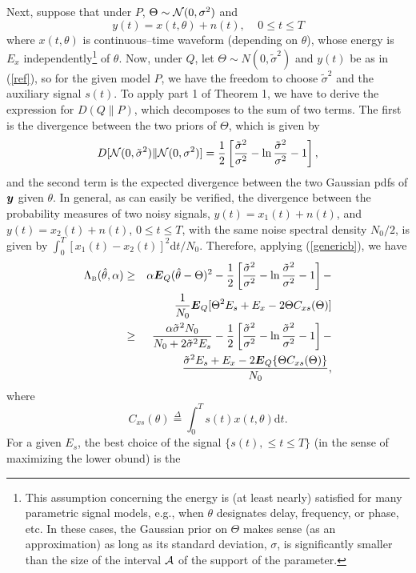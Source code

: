 \documentclass[11pt,epsf]{article}
\newcommand {\dfn} {\stackrel{\Delta} {=}}
\newcommand{\tsig}{\tilde{\sigma}}
\newcommand{\ct}{\hat{\theta}}
\newcommand {\by} {\mbox{\boldmath $y$}}
\newcommand {\bE} {\mbox{\boldmath $E$}}
\newcommand{\calA}{{\cal A}}
\newcommand{\calN}{{\cal N}}
\begin{document}
Next, suppose that under $P$, $\Theta\sim \calN(0,\sigma^2)$ and
\begin{equation}
y(t)=x(t,\theta)+n(t),~~~~~0\le t\le T
\end{equation}
where $x(t,\theta)$ is continuous--time waveform (depending on $\theta$),
whose energy is $E_x$ independently\footnote{This assumption concerning the
energy is (at least
nearly) satisfied for many parametric signal models, e.g., when $\theta$ designates
delay, frequency, or phase, etc. In these cases, the Gaussian prior on
$\Theta$ makes sense (as an approximation) as long as its standard deviation,
$\sigma$, is significantly smaller than the size of the interval $\calA$
of the support of the parameter.}
of $\theta$.
Now, under $Q$, let $\Theta\sim N(0,\tsig^2)$ and $y(t)$ be as in (\ref{ref}),
so for the given model $P$, 
we have the freedom to choose $\tsig^2$ and the auxiliary signal $s(t)$.
To apply part 1 of Theorem 1, we have
to derive the expression for $D(Q\|P)$, which decomposes to the sum of two
terms. The first is the divergence between the two priors of $\Theta$, which
is given by
\begin{equation}
D[\calN(0,\tsig^2)\|\calN(0,\sigma^2)]=\frac{1}{2}\left[
\frac{\tsig^2}{\sigma^2}-
\ln\frac{\tsig^2}{\sigma^2}-1\right],
\end{equation}
and the second term is the expected 
divergence between the two Gaussian pdfs of $\by$ given $\theta$.
In general, as can easily be verified, 
the divergence between the probability measures of two noisy signals,
$y(t)=x_1(t)+n(t)$, and
$y(t)=x_2(t)+n(t)$, $0\le t\le T$, with the same noise spectral density
$N_0/2$, is given by $\int_0^T[x_1(t)-x_2(t)]^2\mbox{d}t/N_0$.
Therefore, applying (\ref{genericb}), we have
\begin{eqnarray}
\label{1stbound}
\Lambda_{\mbox{\tiny B}}(\ct,\alpha)&\ge&\alpha
\bE_Q(\ct-\Theta)^2-\frac{1}{2}\left[\frac{\tsig^2}{\sigma^2}-
\ln\frac{\tsig^2}{\sigma^2}-1\right]-\nonumber\\
& &\frac{1}{N_0}\bE_Q[\Theta^2E_s+E_x-2\Theta C_{xs}(\Theta)]\\
&\ge&\frac{\alpha\tsig^2N_0}{N_0+2\tsig^2E_s}-\frac{1}{2}\left[\frac{\tsig^2}{\sigma^2}-
\ln\frac{\tsig^2}{\sigma^2}-1\right]-\nonumber\\
& &\frac{\tsig^2E_s+E_x-2\bE_Q\{\Theta
C_{xs}(\Theta)\}}{N_0},
\end{eqnarray}
where
$$C_{xs}(\theta)\dfn\int_0^Ts(t)x(t,\theta)\mbox{d}t.$$
For a given $E_s$, the best choice of the signal $\{s(t),\le t\le T\}$ 
(in the sense of maximizing the lower obund) is the
\end{document}
